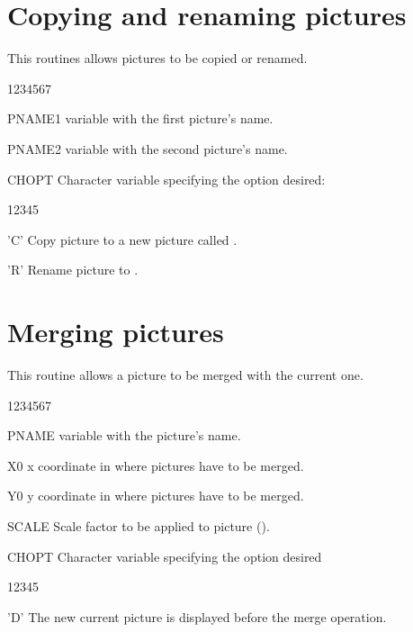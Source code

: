 \section{Copying and renaming pictures}
\Action
This routines allows pictures to be copied or renamed.
\Pdesc
\begin{DLtt}{1234567}
\item[PNAME1]  variable with the first picture's name.
\item[PNAME2]  variable with the second picture's name.
\item[CHOPT] Character variable specifying the option desired:
\begin{DLtt}{12345}
\item['C'] Copy picture  to a new picture called
.
\item['R'] Rename picture  to .
\end{DLtt}
\end{DLtt}

\section{Merging pictures}
\Action
This routine allows a picture to be merged with the current one.
\Pdesc
\begin{DLtt}{1234567}
\item[PNAME]  variable with the picture's name.
\item[X0] x coordinate in \NDC{} where pictures have to be merged.
\item[Y0] y coordinate in \NDC{} where pictures have to be merged.
\item[SCALE] Scale factor to be applied to picture 
().
\item[CHOPT] Character variable specifying the option desired
\begin{DLtt}{12345}
\item['D'] The new current picture is displayed before the merge operation.
\end{DLtt}
\end{DLtt}

\newpage

